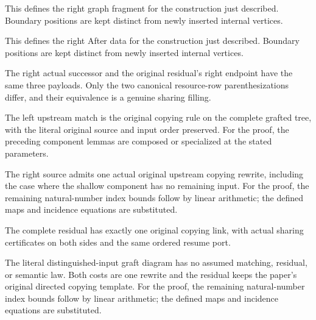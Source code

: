 This defines the right graph fragment for the construction just described. Boundary positions are kept distinct from newly inserted internal vertices.
\par{}

This defines the right After data for the construction just described. Boundary positions are kept distinct from newly inserted internal vertices.
\par{}

The right actual successor and the original residual's right endpoint have the same three payloads. Only the two canonical resource-row parenthesizations differ, and their equivalence is a genuine sharing filling.
\par{}

The left upstream match is the original copying rule on the complete grafted tree, with the literal original source and input order preserved.
For the proof, the preceding component lemmas are composed or specialized at the stated parameters.
\par{}

The right source admits one actual original upstream copying rewrite, including the case where the shallow component has no remaining input.
For the proof, the remaining natural-number index bounds follow by linear arithmetic; the defined maps and incidence equations are substituted.
\par{}

The complete residual has exactly one original copying link, with actual sharing certificates on both sides and the same ordered resume port.
\par{}

The literal distinguished-input graft diagram has no assumed matching, residual, or semantic law. Both costs are one rewrite and the residual keeps the paper's original directed copying template.
For the proof, the remaining natural-number index bounds follow by linear arithmetic; the defined maps and incidence equations are substituted.
\par{}

